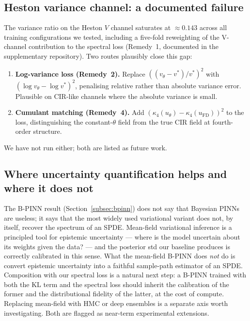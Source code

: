 \documentclass[review,12pt]{elsarticle}
\begin{document}
\subsection{Heston variance channel: a documented failure}

The variance ratio on the Heston \(V\) channel saturates at
\(\approx 0.143\) across all training configurations we tested,
including a five-fold reweighting of the V-channel contribution
to the spectral loss (Remedy~1, documented in the supplementary
repository). Two routes plausibly close this gap:

\begin{enumerate}
\item \textbf{Log-variance loss (Remedy~2).} Replace
\(((v_\theta - v^*)/v^*)^2\) with
\((\log v_\theta - \log v^*)^2\), penalising relative rather than
absolute variance error. Plausible on CIR-like channels where the
absolute variance is small.
\item \textbf{Cumulant matching (Remedy~4).} Add
\((\kappa_4(u_\theta) - \kappa_4(u_{\mathrm{FD}}))^2\) to the
loss, distinguishing the constant-\(\theta\) field from the true
CIR field at fourth-order structure.
\end{enumerate}

We have not run either; both are listed as future work.

\subsection{Where uncertainty quantification helps and where it does not}

The B-PINN result (Section~\ref{subsec:bpinn}) does not say that
Bayesian PINNs are useless; it says that the most widely used
variational variant does not, by itself, recover the spectrum of
an SPDE. Mean-field variational inference is a principled tool for
epistemic uncertainty --- where is the model uncertain about its
weights given the data? --- and the posterior std our baseline
produces is correctly calibrated in this sense. What the
mean-field B-PINN does \emph{not} do is convert epistemic
uncertainty into a faithful sample-path estimator of an SPDE.
Composition with our spectral loss is a natural next step: a
B-PINN trained with both the KL term and the spectral loss should
inherit the calibration of the former and the distributional
fidelity of the latter, at the cost of compute. Replacing
mean-field with HMC or deep ensembles is a separate axis worth
investigating. Both are flagged as near-term experimental
extensions.
\end{document}
